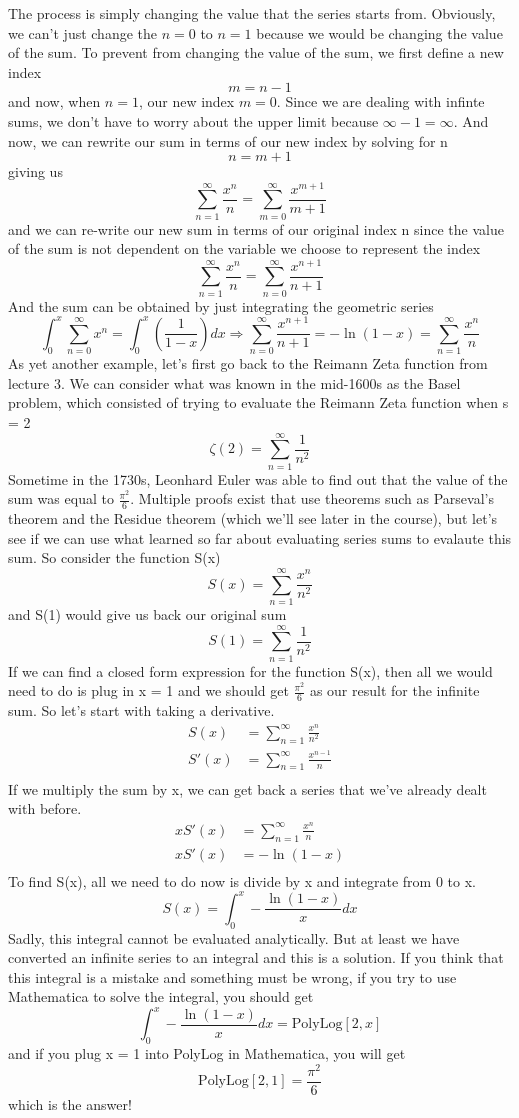\documentclass{article}
\newcommand{\be}{\begin{equation}}
\newcommand{\ee}{\end{equation}}
\newcommand{\sumzero}{\sum_{n=0}^\infty}
\newcommand{\sumone}{\sum_{n=1}^\infty}
\begin{document}
The process is simply changing the value that the series starts from.
Obviously, we can't just change the $n = 0$ to $n = 1$ because we would be changing the value of the sum.
To prevent from changing the value of the sum, we first define a new index
\be
m = n - 1
\ee
and now, when $n = 1$, our new index $m = 0$.
Since we are dealing with infinte sums, we don't have to worry about the upper limit because $\infty - 1 = \infty$.
And now, we can rewrite our sum in terms of our new index by solving for n
\be
n = m + 1
\ee
giving us
\be
\sumone \frac{x^n}{n} = \sum_{m = 0}^{\infty} \frac{x^{m + 1}}{m + 1}
\ee
and we can re-write our new sum in terms of our original index n since the value of the sum is not dependent on the variable we choose to represent the index
\be
\sumone \frac{x^n}{n} = \sum_{n = 0}^{\infty} \frac{x^{n + 1}}{n + 1}
\ee
And the sum can be obtained by just integrating the geometric series
\be
\int_{0}^{x} \sumzero x^n = \int_{0}^{x} \left( \frac{1}{1 - x} \right) dx \Rightarrow \sum_{n = 0}^{\infty} \frac{x^{n + 1}}{n + 1} =  - \ln(1 - x) = \sumone \frac{x^n}{n}
\ee
As yet another example, let's first go back to the Reimann Zeta function from lecture 3.
We can consider what was known in the mid-1600s as the Basel problem, which consisted of trying to evaluate the Reimann Zeta function when s = 2
\be
\zeta(2) = \sum_{n=1}^\infty \frac{1}{n^2}
\ee
Sometime in the 1730s, Leonhard Euler was able to find out that the value of the sum was equal to $\frac{\pi^2}{6}$.
Multiple proofs exist that use theorems such as Parseval's theorem and the Residue theorem (which we'll see later in the course), but let's see if we can use what learned so far about evaluating series sums to evalaute this sum.
So consider the function S(x)
\be
S(x) = \sum_{n=1}^\infty \frac{x^n}{n^2}
\ee
and S(1) would give us back our original sum
\be
S(1) = \sum_{n=1}^\infty \frac{1}{n^2}
\ee
If we can find a closed form expression for the function S(x), then all we would need to do is plug in x = 1 and we should get $\frac{\pi^2}{6}$ as our result for the infinite sum.
So let's start with taking a derivative.
\be
\begin{split}
	S(x) &= \sum_{n=1}^\infty \frac{x^n}{n^2}\\
	S'(x) &= \sum_{n=1}^\infty \frac{x^{n-1}}{n}\\
\end{split}
\ee
If we multiply the sum by x, we can get back a series that we've already dealt with before.
\be
\begin{split}
	x S'(x) &= \sum_{n=1}^\infty \frac{x^{n}}{n}\\
	x S'(x) &= - \ln(1-x)\\
\end{split}
\ee
To find S(x), all we need to do now is divide by x and integrate from 0 to x.
\be
	S(x) = \int_0^x - \frac{\ln(1-x)}{x} dx
\ee
Sadly, this integral cannot be evaluated analytically.
But at least we have converted an infinite series to an integral and this is a solution.
If you think that this integral is a mistake and something must be wrong, if you try to use Mathematica to solve the integral, you should get
\be
\int_0^x - \frac{\ln(1-x)}{x} dx = \text{PolyLog}[2,x]
\ee
and if you plug x = 1 into PolyLog in Mathematica, you will get
\be
\text{PolyLog}[2,1] = \frac{\pi^2}{6}
\ee
which is the answer!
\end{document}

